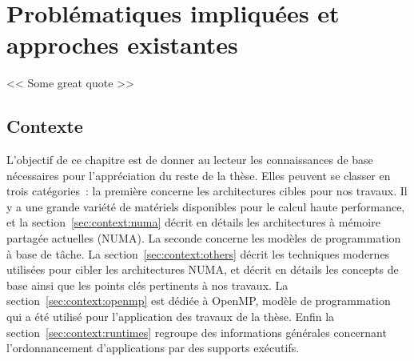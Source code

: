 \part{Problématiques impliquées et approches existantes}

\begin{savequote}[6cm]
<< Some great quote  >>
\end{savequote}
\chapter{Contexte}\label{chap:contexte}
\chaptertoc

\pagebreak

L'objectif de ce chapitre est de donner au lecteur les connaissances de base nécessaires pour l'appréciation du reste de la thèse.
Elles peuvent se classer en trois catégories~: la première concerne les architectures cibles pour nos travaux. Il y a une grande variété de matériels disponibles pour le calcul haute performance, et la section~\ref{sec:context:numa} décrit en détails les architectures à mémoire partagée actuelles (NUMA).
La seconde concerne les modèles de programmation à base de tâche. La section~\ref{sec:context:others} décrit les techniques modernes utilisées pour cibler les architectures NUMA, et décrit en détails les concepts de base ainsi que les points clés pertinents à nos travaux. La section~\ref{sec:context:openmp} est dédiée à OpenMP, modèle de programmation qui a été utilisé pour l'application des travaux de la thèse.
Enfin la section~\ref{sec:context:runtimes} regroupe des informations générales concernant l'ordonnancement d'applications par des supports exécutifs.







